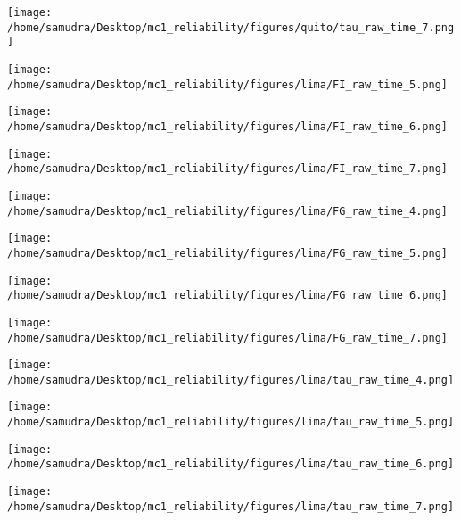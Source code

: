 \documentclass[a4paper]{article}
\def\lthtmlcheckvsize{\ifdim\ht\sizebox<\vsize 
  \ifdim\wd\sizebox<\hsize\expandafter\hfill\fi \expandafter\vfill
  \else\expandafter\vss\fi}%
\begin{document}
{\newpage\clearpage
{}%
\texttt{[image: /home/samudra/Desktop/mc1\_reliability/figures/quito/tau\_raw\_time\_7.png]}%
\lthtmlpictureZ
\lthtmlcheckvsize\clearpage}

{\newpage\clearpage
{}%
\texttt{[image: /home/samudra/Desktop/mc1\_reliability/figures/lima/FI\_raw\_time\_5.png]}%
\lthtmlpictureZ
\lthtmlcheckvsize\clearpage}

{\newpage\clearpage
{}%
\texttt{[image: /home/samudra/Desktop/mc1\_reliability/figures/lima/FI\_raw\_time\_6.png]}%
\lthtmlpictureZ
\lthtmlcheckvsize\clearpage}

{\newpage\clearpage
{}%
\texttt{[image: /home/samudra/Desktop/mc1\_reliability/figures/lima/FI\_raw\_time\_7.png]}%
\lthtmlpictureZ
\lthtmlcheckvsize\clearpage}

{\newpage\clearpage
{}%
\texttt{[image: /home/samudra/Desktop/mc1\_reliability/figures/lima/FG\_raw\_time\_4.png]}%
\lthtmlpictureZ
\lthtmlcheckvsize\clearpage}

{\newpage\clearpage
{}%
\texttt{[image: /home/samudra/Desktop/mc1\_reliability/figures/lima/FG\_raw\_time\_5.png]}%
\lthtmlpictureZ
\lthtmlcheckvsize\clearpage}

{\newpage\clearpage
{}%
\texttt{[image: /home/samudra/Desktop/mc1\_reliability/figures/lima/FG\_raw\_time\_6.png]}%
\lthtmlpictureZ
\lthtmlcheckvsize\clearpage}

{\newpage\clearpage
{}%
\texttt{[image: /home/samudra/Desktop/mc1\_reliability/figures/lima/FG\_raw\_time\_7.png]}%
\lthtmlpictureZ
\lthtmlcheckvsize\clearpage}

{\newpage\clearpage
{}%
\texttt{[image: /home/samudra/Desktop/mc1\_reliability/figures/lima/tau\_raw\_time\_4.png]}%
\lthtmlpictureZ
\lthtmlcheckvsize\clearpage}

{\newpage\clearpage
{}%
\texttt{[image: /home/samudra/Desktop/mc1\_reliability/figures/lima/tau\_raw\_time\_5.png]}%
\lthtmlpictureZ
\lthtmlcheckvsize\clearpage}

{\newpage\clearpage
{}%
\texttt{[image: /home/samudra/Desktop/mc1\_reliability/figures/lima/tau\_raw\_time\_6.png]}%
\lthtmlpictureZ
\lthtmlcheckvsize\clearpage}

{\newpage\clearpage
{}%
\texttt{[image: /home/samudra/Desktop/mc1\_reliability/figures/lima/tau\_raw\_time\_7.png]}%
\lthtmlpictureZ
\lthtmlcheckvsize\clearpage}

\end{document}
